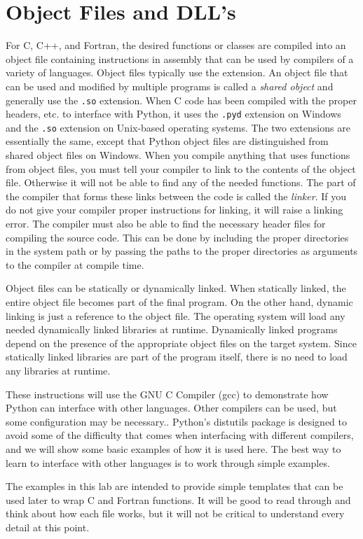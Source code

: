 \section*{Object Files and DLL's}
For C, C++, and Fortran, the desired functions or classes are compiled into an object file containing instructions in assembly that can be used by compilers of a variety of languages.
Object files typically use the \of extension.
An object file that can be used and modified by multiple programs is called a \emph{shared object} and generally use the \texttt{.so} extension.
When C code has been compiled with the proper headers, etc. to interface with Python, it uses the \texttt{.pyd} extension on Windows and the \texttt{.so} extension on Unix-based operating systems.
The two extensions are essentially the same, except that Python object files are distinguished from shared object files on Windows.
When you compile anything that uses functions from object files, you must tell your compiler to link to the contents of the object file.
Otherwise it will not be able to find any of the needed functions.
The part of the compiler that forms these links between the code is called the \emph{linker}.
If you do not give your compiler proper instructions for linking, it will raise a linking error.
The compiler must also be able to find the necessary header files for compiling the source code.
This can be done by including the proper directories in the system path or by passing the paths to the proper directories as arguments to the compiler at compile time.

Object files can be statically or dynamically linked.
When statically linked, the entire object file becomes part of the final program.
On the other hand, dynamic linking is just a reference to the object file.
The operating system will load any needed dynamically linked libraries at runtime.
Dynamically linked programs depend on the presence of the appropriate object files on the target system.
Since statically linked libraries are part of the program itself, there is no need to load any libraries at runtime.

These instructions will use the GNU C Compiler (gcc) to demonstrate how Python can interface with other languages.
Other compilers can be used, but some configuration may be necessary..
Python's distutils package is designed to avoid some of the difficulty that comes when interfacing with different compilers, and we will show some basic examples of how it is used here.
The best way to learn to interface with other languages is to work through simple examples.
\begin{info}
The examples in this lab are intended to provide simple templates that can be used later to wrap C and Fortran functions.
It will be good to read through and think about how each file works, but it will not be critical to understand every detail at this point.
\end{info}

